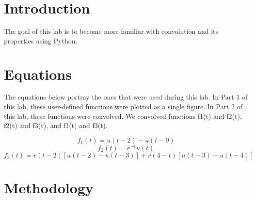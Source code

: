 \documentclass[12pt]{report}
\begin{document}
\section{Introduction}
 

The goal of this lab is to become more familiar with convolution and its properties using Python. 

\section{Equations}

The equations below portray the ones that were used during this lab. In Part 1 of this lab, these user-defined functions were plotted as a single figure. In Part 2 of this lab, these functions were convolved. We convolved functions f1(t) and f2(t), f2(t) and f3(t), and f1(t) and f3(t). 

\begin{equation}
    f_{1}(t) = u(t−2) − u(t−9)
\end{equation}
\begin{equation}
    f_{2}(t) = e^{-t}u(t)
\end{equation}
\begin{equation}
    f_{3}(t) = r(t-2)[u(t-2) - u(t-3)] + r(4-t)[u(t-3) - u(t-4)]
\end{equation}


\section{Methodology}
\end{document}
